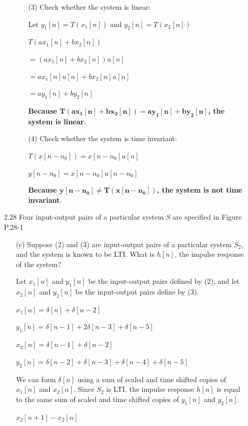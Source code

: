 \documentclass[fleqn]{article}
\begin{document}
\begin{enumerate}[nolistsep]
\begin{enumerate}[nolistsep]
\begin{enumerate}[nolistsep]
					\item[(3)] Check whether the system is linear:
					
					Let $y_1[n] = T(x_1[n])$ and $y_2[n] = T(x_2[n])$
					
					$T(ax_1[n] + bx_2[n])$
					
					$ = (ax_1[n] + bx_2[n])u[n]$
					
					$ = ax_1[n]u[n] + bx_2[n]u[n]$
					
					$ = ay_1[n] + by_2[n]$
					
					\textbf{Because $\mathbf{T(ax_1[n] + bx_2[n]) = ay_1[n] + by_2[n]}$, the system is linear}.
					
					\item[(4)] Check whether the system is time invariant:
					
					$T(x[n-n_0]) = x[n-n_0]u[n]$
					
					$y[n-n_0] = x[n-n_0]u[n-n_0]$
					
					\textbf{Because $\mathbf{y[n-n_0] \neq T(x[n-n_0])}$, the system is not time invariant}.
				\end{enumerate}			
		\end{enumerate}
		
		\item[2.28] Four input-output pairs of a particular system $S$ are specified in Figure P.28-1
		
			\begin{enumerate}
				\item[(c)] Suppose (2) and (3) are input-output pairs of a particular system $S_2$, and the system is known to be LTI. What is $h[n]$, the impulse response of the system?
				
				Let $x_1[n]$ and $y_1[n]$ be the input-output pairs defined by (2), and let $x_2[n]$ and $y_2[n]$ be the input-output pairs define by (3).
				
			$x_1[n] = \delta[n] + \delta[n-2]$
			
			$y_1[n] = \delta[n-1] + 2\delta[n-3] + \delta[n-5]$
			
			$x_2[n] = \delta[n-1] + \delta[n-2]$
			
			$y_2[n] = \delta[n-2] + \delta[n-3] + \delta[n-4] + \delta[n-5]$
			
			We can form $\delta[n]$ using a sum of scaled and time shifted copies of $x_1[n]$ and $x_2[n]$. Since $S_2$ is LTI, the impulse response $h[n]$ is equal to the same sum of scaled and time shifted copies of $y_1[n]$ and $y_2[n]$.
			
			$x_2[n+1] - x_2[n]$
			

\end{enumerate}
\end{enumerate}
\end{document}
